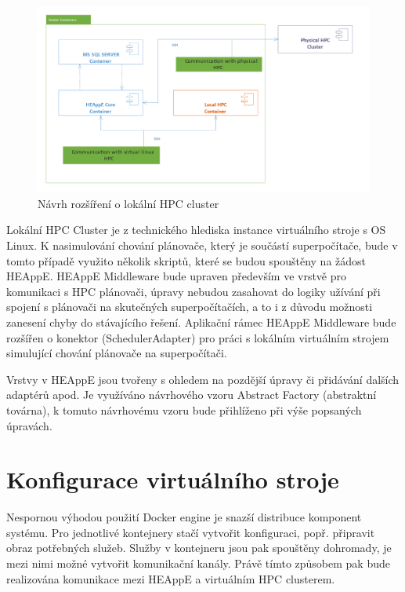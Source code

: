 \newpage
\begin{figure}
	\centering
	\includegraphics[width=1.0\textwidth]{Figures/local-hpc-clsuter-navrh.png}
	\caption{Návrh rozšíření o lokální HPC cluster}
	\label{fig:navrh-rozsireni-o-lokalni-hpc-clsuter}
\end{figure}

Lokální HPC Cluster je z technického hlediska instance virtuálního stroje s OS Linux. K nasimulování chování plánovače, který je součástí superpočítače, bude v tomto případě využito několik skriptů, které se budou spouštěny na žádost HEAppE. HEAppE Middleware bude upraven především ve vrstvě pro komunikaci s HPC plánovači, úpravy nebudou zasahovat do logiky užívání při spojení s plánovači na skutečných superpočítačích, a to i z důvodu možnosti zanesení chyby do stávajícího řešení. Aplikační rámec HEAppE Middleware bude rozšířen o konektor (SchedulerAdapter) pro práci s lokálním virtuálním strojem simulující chování plánovače na superpočítači.

Vrstvy v HEAppE jsou tvořeny s ohledem na pozdější úpravy či přidávání dalších adaptérů apod. Je využíváno návrhového vzoru Abstract Factory (abstraktní továrna), k tomuto návrhovému vzoru bude přihlíženo při výše popsaných úpravách.

\section{Konfigurace virtuálního stroje}
Nespornou výhodou použití Docker engine je snazší distribuce komponent systému. Pro jednotlivé kontejnery stačí vytvořit konfiguraci, popř. připravit obraz potřebných služeb. Služby v kontejneru jsou pak spouštěny dohromady, je mezi nimi možné vytvořit komunikační kanály. Právě tímto způsobem pak bude realizována komunikace mezi HEAppE a virtuálním HPC clusterem.

